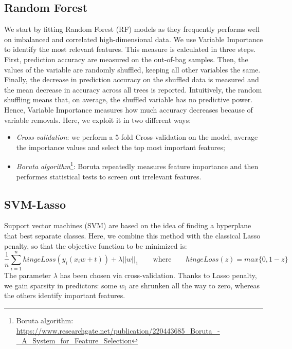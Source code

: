 \documentclass[a4paper,11pt, oneside]{article}  %
\begin{document}
\subsection{Random Forest}
We start by fitting Random Forest (RF) models as they frequently performs well on imbalanced and correlated high-dimensional data. We use Variable Importance to identify the most relevant features. This measure is calculated in three steps. First, prediction accuracy are measured on the out-of-bag samples. Then, the values of the variable are randomly shuffled, keeping all other variables the same. Finally, the decrease in prediction accuracy on the shuffled data is measured and the mean decrease in accuracy across all trees is reported.  Intuitively, the random shuffling means that, on average, the shuffled variable has no predictive power. \\
Hence, Variable Importance measures how much accuracy decreases because of variable removals. Here, we exploit it in two different ways:
\begin{itemize}
	\item \textit{Cross-validation}: we perform a 5-fold Cross-validation on the model, average the importance values and select the top most important features;
	\item \textit{Boruta algorithm}\footnote{Boruta algorithm: \url{https://www.researchgate.net/publication/220443685_Boruta_-_A_System_for_Feature_Selection}}: Boruta repeatedly measures feature importance and then performes statistical tests to screen out irrelevant features. 
\end{itemize} 

\subsection{SVM-Lasso}
Support vector machines (SVM) are based on the idea of finding a hyperplane that best separate classes. Here, we combine this method with the classical Lasso penalty, so that the objective function to be minimized is:
\begin{equation*}
	\dfrac{1}{n} \sum_{i=1}^n hingeLoss(y_i(x_i w + t)) + \lambda ||w||_1  \qquad	\text{where} \qquad  hingeLoss(z) = max\{0, 1-z\}
\end{equation*}
The parameter $\lambda$ has been chosen via cross-validation. Thanks to Lasso penalty, we gain sparsity in predictors: some $w_i$ are shrunken all the way to zero, whereas the others identify important features. 
\end{document}
